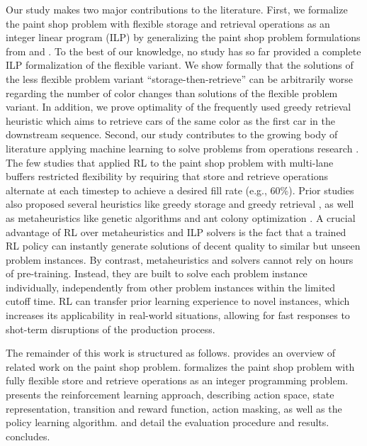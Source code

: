 \documentclass[11pt]{elsarticle}
\newcommand{\blackversion}{ }
\newcommand{\blackorcolor}{
\ifdefined\blackversion
	\color{black}
\fi
}
\newcommand{\REV}[1]{{\color{myblue}\blackorcolor #1}}
\begin{document}

\REV{Our study makes two major contributions to the literature. 
First, we formalize the paint shop problem with flexible storage and retrieval operations as an integer linear program (ILP) by generalizing the paint shop problem formulations from \citet{Ding.2004} and \citet{spieckermann_sequential_2004}. To the best of our knowledge, no study has so far provided a complete ILP formalization of the flexible variant. 
We show formally that the solutions of the less flexible problem variant ``storage-then-retrieve'' can be arbitrarily worse regarding the number of color changes than solutions of the flexible problem variant. In addition, we prove optimality of the frequently used greedy retrieval heuristic which aims to retrieve cars of the same color as the first car in the downstream sequence. Second, our study contributes to the growing body of literature applying machine learning to solve problems from operations research \citep{Bengio.2021,Panzer.2022}. The few studies that applied RL to the paint shop problem with multi-lane buffers \citep{Huang.2024,Leng.2020,Leng.2023} restricted flexibility by requiring that store and retrieve operations alternate at each timestep to achieve a desired fill rate (e.g., 60\%). 
Prior studies also proposed several heuristics like greedy storage and greedy retrieval \citep{Bysko.2020,Leng.2020,spieckermann_sequential_2004, sun2015colour}, as well as metaheuristics like genetic algorithms \citep{ko2016paint} and ant colony optimization \citep{Lin.2011}. 
A crucial advantage of RL over metaheuristics and ILP solvers is the fact that a trained RL policy can instantly  generate solutions of decent quality to similar but unseen problem instances. By contrast, metaheuristics and solvers cannot rely on hours of pre-training. Instead, they are built to solve each problem instance individually, independently from other problem instances within the limited cutoff time. RL can transfer prior learning experience to novel instances, which increases its applicability in real-world situations, allowing for fast responses to shot-term disruptions of the production process.}


The remainder of this work is structured as follows.  provides an overview of related work on the paint shop problem.  formalizes the paint shop problem with fully flexible store and retrieve operations as an integer programming problem.  presents the reinforcement learning approach, describing action space, state representation, transition and reward function, action masking, as well as the policy learning algorithm.  and  detail the evaluation procedure and results.  concludes.
\end{document}
